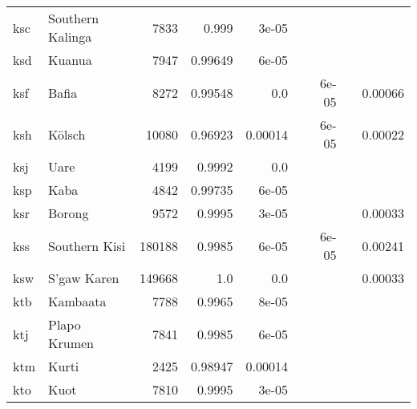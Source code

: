 \documentclass[11pt]{article}
\begin{document}
\begin{table*}[h]
{\begin{tabular}{llrrrrrrr}
ksc         & Southern Kalinga         & 7833         & 0.999         & 3e-05         &          &          &          &          \\

ksd         & Kuanua         & 7947         & 0.99649         & 6e-05         &          &          &          &          \\

ksf         & Bafia         & 8272         & 0.99548         & 0.0         &          & 6e-05         &          & 0.00066         \\

ksh         & Kölsch         & 10080         & 0.96923         & 0.00014         &          & 6e-05         &          & 0.00022         \\

ksj         & Uare         & 4199         & 0.9992         & 0.0         &          &          &          &          \\

ksp         & Kaba         & 4842         & 0.99735         & 6e-05         &          &          &          &          \\

ksr         & Borong         & 9572         & 0.9995         & 3e-05         &          &          &          & 0.00033         \\

kss         & Southern Kisi         & 180188         & 0.9985         & 6e-05         &          & 6e-05         &          & 0.00241         \\

ksw         & S'gaw Karen         & 149668         & 1.0         & 0.0         &          &          &          & 0.00033         \\

ktb         & Kambaata         & 7788         & 0.9965         & 8e-05         &          &          &          &          \\

ktj         & Plapo Krumen         & 7841         & 0.9985         & 6e-05         &          &          &          &          \\

ktm         & Kurti         & 2425         & 0.98947         & 0.00014         &          &          &          &          \\

kto         & Kuot         & 7810         & 0.9995         & 3e-05         &          &          &          &          \\


\end{tabular}}
\end{table*}
\end{document}

